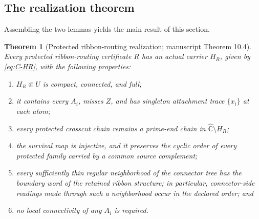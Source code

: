 \documentclass[11pt,reqno]{amsart}
\newtheorem{theorem}{Theorem}[section]
\theoremstyle{definition}
\theoremstyle{remark}
\newcommand{\Chat}{\widehat{\mathbb C}}
\begin{document}
\subsection*{The realization theorem}
Assembling the two lemmas yields the main result of this section.

\begin{theorem}[Protected ribbon-routing realization; manuscript
Theorem 10.4]\label{thm:realization}
Every protected ribbon-routing certificate $R$ has an actual carrier
$H_R$, given by \eqref{eq:C-HR}, with the following properties:
\begin{enumerate}
\item $H_R\Subset U$ is compact, connected, and full;
\item it contains every $A_i$, misses $Z$, and has singleton attachment
trace $\{x_i\}$ at each atom;
\item every protected crosscut chain remains a prime-end chain in
$\Chat\setminus H_R$;
\item the survival map is injective, and it preserves the cyclic order of
every protected family carried by a common source complement;
\item every sufficiently thin regular neighborhood of the connector tree
has the boundary word of the retained ribbon structure; in particular,
connector-side readings made through such a neighborhood occur in the
declared order; and
\item no local connectivity of any $A_i$ is required.
\end{enumerate}
\end{theorem}
\end{document}
